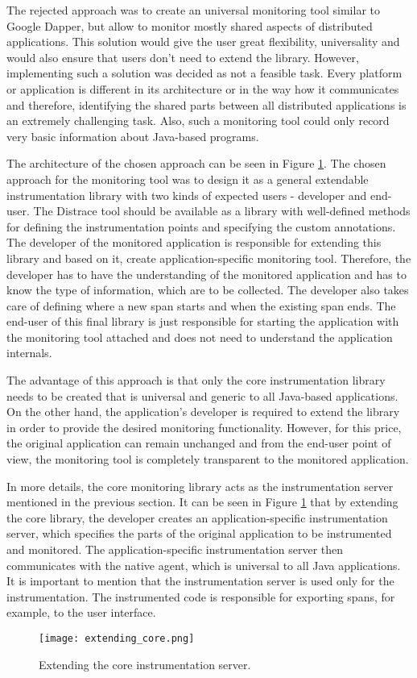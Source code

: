 The rejected approach was to create an universal monitoring tool similar to Google Dapper, but allow to monitor mostly shared aspects of distributed applications. This solution would give the user great flexibility, universality and would also ensure that users don't need to extend the library. However, implementing such a solution was decided as not a feasible task. Every platform or application is different in its architecture or in the way how it communicates and therefore, identifying the shared parts between all distributed applications is an extremely challenging task. Also, such a monitoring tool could only record very basic information about Java-based programs.

The architecture of the chosen approach can be seen in Figure \ref{fig:extending_core}. The chosen approach for the monitoring tool was to design it as a general extendable instrumentation library with two kinds of expected users - developer and end-user. The Distrace tool should be available as a library with well-defined methods for defining the instrumentation points and specifying the custom annotations. The developer of the monitored application is responsible for extending this library and based on it, create application-specific monitoring tool. Therefore, the developer has to have the understanding of the monitored application and has to know the type of information, which are to be collected. The developer also takes care of defining where a new span starts and when the existing span ends. The end-user of this final library is just responsible for starting the application with the monitoring tool attached and does not need to understand the application internals.

The advantage of this approach is that only the core instrumentation library needs to be created that is universal and generic to all Java-based applications. On the other hand, the application's developer is required to extend the library in order to provide the desired monitoring functionality. However, for this price, the original application can remain unchanged and from the end-user point of view, the monitoring tool is completely transparent to the monitored application.

In more details, the core monitoring library acts as the instrumentation server mentioned in the previous section. It can be seen in Figure \ref{fig:extending_core} that by extending the core library, the developer creates an application-specific instrumentation server, which specifies the parts of the original application to be instrumented and monitored. The application-specific instrumentation server then communicates with the native agent, which is universal to all Java applications. It is important to mention that the instrumentation server is used only for the instrumentation. The instrumented code is responsible for exporting spans, for example, to the user interface.
\begin{figure}
	\centering
	\texttt{[image: extending\_core.png]}
	\caption{Extending the core instrumentation server.}
	\label{fig:extending_core}
\end{figure}


